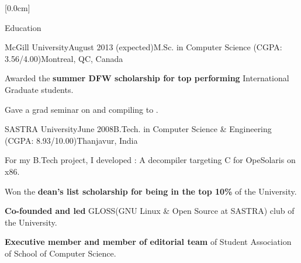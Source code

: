 \documentclass{resume} %
\begin{document}
[0.0cm]
 \begin{rSection}{Education}

\begin{rSubsection}{McGill University}{August 2013 (expected)}{M.Sc. in Computer Science (CGPA: 3.56/4.00)}{Montreal, QC, Canada}
\item Awarded the  \textbf{summer DFW scholarship for top performing} International Graduate students.
\item Gave a grad seminar on \xten and compiling \matlab to \xten.
\end{rSubsection}
\begin{rSubsection}{SASTRA University}{June 2008}{B.Tech. in Computer Science \& Engineering (CGPA: 8.93/10.00)}{Thanjavur, India}
\item For my B.Tech project, I developed \discode: A decompiler targeting C for OpeSolaris on x86.
\item Won the  \textbf{dean's list scholarship for being in the top 10\% }of the University. 
\item \textbf{Co-founded and led} GLOSS(GNU Linux \& Open Source at SASTRA) club of the University.
\item \textbf{Executive member and member of editorial team} of Student Association of School of Computer Science. 
\end{rSubsection}

\end{rSection}
\end{document}

